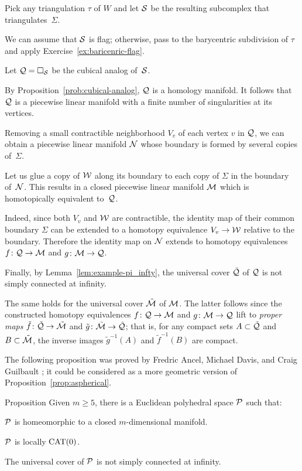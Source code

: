 Pick any triangulation $\tau$ of $W$ and let $\mathcal{S}$ be the resulting subcomplex that triangulates~$\Sigma$.


We can assume that $\mathcal{S}$ is flag; 
otherwise, pass to the barycentric subdivision 
of $\tau$ and apply Exercise~\ref{ex:baricenric-flag}.


Let $\mathcal{Q}=\square_{\mathcal{S}}$ be the cubical analog of~$\mathcal{S}$.

By Proposition~\ref{prob:cubical-analog},
$\mathcal{Q}$ is a homology manifold.
It follows that $\mathcal{Q}$ is a piecewise linear manifold 
with a finite number of singularities at its vertices.


Removing a small contractible neighborhood $V_v$ of each vertex $v$ in $\mathcal{Q}$,
we can obtain a piecewise linear manifold $\mathcal{N}$
whose boundary is formed by several copies of~$\Sigma$.

Let us glue a copy of  $\mathcal{W}$ along its boundary to each copy of $\Sigma$ in the boundary of~$\mathcal{N}$.
This results in a  closed piecewise linear manifold 
$\mathcal{M}$ which is homotopically equivalent to~$\mathcal{Q}$.

Indeed, since both $V_v$ and $\mathcal{W}$ are contractible, the identity map of  their common boundary $\Sigma$ can be extended to a homotopy equivalence $V_v\to\mathcal{W}$ relative to the boundary.
Therefore the identity map on $\mathcal{N}$ extends to homotopy equivalences 
$f\colon \mathcal{Q}\to \mathcal{M}$ and $g\colon\mathcal{M}\to \mathcal{Q}$.

Finally, by Lemma~\ref{lem:example-pi_infty},  
the universal cover $\tilde{\mathcal{Q}}$ of $\mathcal{Q}$
is not simply connected at infinity.

The same holds for 
the universal cover $\tilde{\mathcal{M}}$ of $\mathcal{M}$.
The latter follows since the constructed homotopy equivalences 
$f\colon \mathcal{Q}\to \mathcal{M}$ and $g\:\spc M\z\to \spc Q$ 
lift to {}\emph{proper maps} 
$\tilde f \colon \tilde{\mathcal{Q}}\to \tilde{\mathcal{M}}$
and $\tilde g \colon \tilde{\mathcal{M}}\to \tilde{\mathcal{Q}}$;
that is, for any compact sets $A\subset \tilde{\mathcal{Q}}$ and $B\subset\tilde{\mathcal{M}}$, the inverse images $\tilde g^{-1}(A)$ and $\tilde f^{-1}(B)$ are compact.
\qeds


The following proposition was proved by
Fredric Ancel, 
Michael Davis,
and Craig Guilbault \cite{ancel-davis-guilbault};
it could be considered as a more geometric version of Proposition~\ref{prop:aspherical}.


\begin{thm}{Proposition}\label{prop:loc-CAT-mnfld}
Given $m\ge 5$, there is a Euclidean polyhedral space $\mathcal{P}$ such that:
\begin{subthm}{}
$\mathcal{P}$ is homeomorphic to a closed $m$-dimensional manifold.
\end{subthm}

\begin{subthm}{}
$\mathcal{P}$ is locally $\mathrm{CAT}(0)$.
\end{subthm}

\begin{subthm}{}
The universal cover of $\mathcal{P}$ is not simply connected at infinity.
\end{subthm}
\end{thm}


